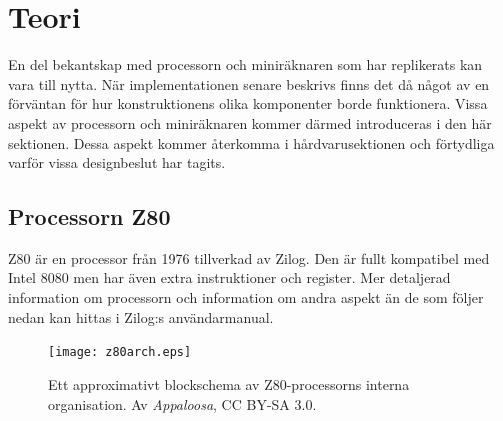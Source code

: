 \documentclass[main.tex]{subfiles}
\begin{document}
\section{Teori}
En del bekantskap med processorn och miniräknaren som har replikerats kan vara
till nytta. När implementationen senare beskrivs finns det då något av en
förväntan för hur konstruktionens olika komponenter borde funktionera. Vissa
aspekt av processorn och miniräknaren kommer därmed introduceras i den här
sektionen. Dessa aspekt kommer återkomma i hårdvarusektionen och förtydliga
varför vissa designbeslut har tagits.

\subsection{Processorn Z80}
Z80 är en processor från 1976 tillverkad av Zilog. Den är fullt kompatibel med
Intel 8080 men har även extra instruktioner och register. Mer detaljerad
information om processorn och information om andra aspekt än de som följer
nedan kan hittas i Zilog:s användarmanual.\cite{z80um}
\begin{figure}[H]
    \center
    \texttt{[image: z80arch.eps]}
    \caption{Ett approximativt blockschema av Z80-processorns interna
    organisation. Av {\it Appaloosa}, CC BY-SA 3.0.}
    \label{fig:z80arch}
\end{figure}
\end{document}
